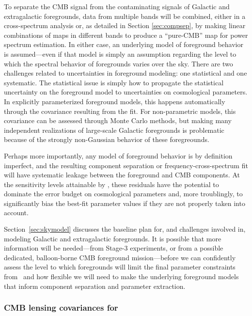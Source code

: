 To separate the CMB signal from the contaminating signals of Galactic and extragalactic foregrounds, 
data from multiple bands will be combined, either 
in a cross-spectrum analysis or, as detailed in Section \ref{sec:compsep}, by making linear 
combinations of maps in different bands to produce a ``pure-CMB'' map for power spectrum estimation.
In either case, an underlying model of foreground behavior is assumed---even if that model is simply
an assumption regarding the level to which the spectral behavior of foregrounds varies over the sky.
There are two challenges related to uncertainties in foreground modeling: one statistical and one
systematic. The statistical issue is simply how to propagate the statistical uncertainty on the foreground 
model to uncertainties on cosmological parameters. In explicitly parameterized foreground models, 
this happens automatically through the covariance resulting from the fit. For non-parametric models,
this covariance can be assessed through Monte Carlo methods, but making many independent 
realizations of large-scale Galactic foregrounds is problematic because of the strongly non-Gaussian
behavior of these foregreounds.

Perhaps more importantly, 
any model of foreground behavior is by definition imperfect, and the resulting component separation
or frequency-cross-spectrum fit will have systematic leakage between the foreground and CMB components.
At the sensitivity levels attainable by \cmbexp, these residuals have the potential to dominate the
error budget on cosmological parameters and, more troublingly, to significantly bias the best-fit 
parameter values if they are not properly taken into account.

Section~\ref{sec:skymodel} discusses the baseline plan for, and challenges involved in, modeling
Galactic and extragalactic foregrounds. It is possible that more information will be needed---from 
Stage-3 experiments, or from a possible dedicated, balloon-borne CMB foreground mission---before
we can confidently assess the level to which foregrounds will limit the final parameter constraints
from \cmbexp\ and how flexible we will need to make the underlying foreground models that 
inform component separation and parameter extraction. 

\subsubsection{CMB lensing covariances for \cmbexp }
\label{se:covs}

